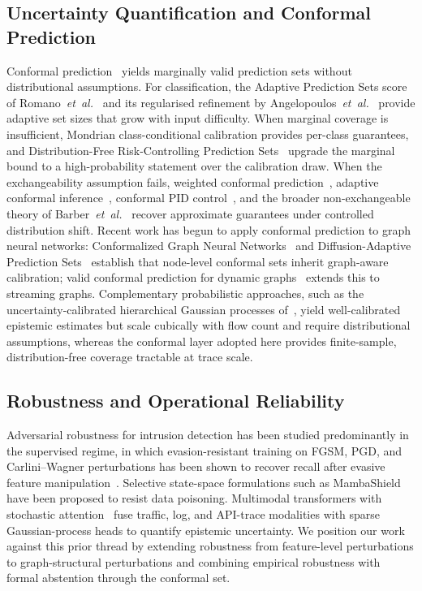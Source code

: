 \documentclass{ieeeaccess}
\begin{document}
\subsection{Uncertainty Quantification and Conformal Prediction}
Conformal prediction~\cite{vovk2022alrw,shafer2008tutorial,angelopoulos2023gentle}
yields marginally valid prediction sets without distributional assumptions.
For classification, the Adaptive Prediction Sets score of
Romano~\emph{et~al.}~\cite{romano2020aps} and its regularised refinement by
Angelopoulos~\emph{et~al.}~\cite{angelopoulos2021raps} provide adaptive set
sizes that grow with input difficulty. When marginal coverage is insufficient,
Mondrian class-conditional calibration provides per-class guarantees, and
Distribution-Free Risk-Controlling Prediction
Sets~\cite{bates2021rcps,angelopoulos2025ltt,angelopoulos2024crc} upgrade
the marginal bound to a high-probability statement over the calibration
draw. When the exchangeability assumption fails, weighted
conformal prediction~\cite{tibshirani2019wcp}, adaptive conformal
inference~\cite{gibbs2021aci}, conformal PID
control~\cite{angelopoulos2024pid}, and the broader non-exchangeable theory
of Barber~\emph{et~al.}~\cite{barber2023nonexch} recover approximate
guarantees under controlled distribution shift. Recent work has begun to
apply conformal prediction to graph neural networks: Conformalized Graph
Neural Networks~\cite{huang2023cfgnn} and Diffusion-Adaptive Prediction
Sets~\cite{zargarbashi2023daps} establish that node-level conformal sets
inherit graph-aware calibration; valid conformal prediction for dynamic
graphs~\cite{davis2025dyncp} extends this to streaming graphs.
Complementary probabilistic approaches, such as the uncertainty-calibrated
hierarchical Gaussian processes of~\cite{anaedevha2026hgp}, yield
well-calibrated epistemic estimates but scale cubically with flow count
and require distributional assumptions, whereas the conformal layer
adopted here provides finite-sample, distribution-free coverage tractable
at trace scale.

\subsection{Robustness and Operational Reliability}
Adversarial robustness for intrusion detection has been studied
predominantly in the supervised regime, in which evasion-resistant training
on FGSM, PGD, and Carlini--Wagner perturbations has been shown to recover
recall after evasive feature
manipulation~\cite{anaedevha2024robustadv}. Selective state-space
formulations such as MambaShield~\cite{anaedevha2025mambashield} have been
proposed to resist data poisoning. Multimodal transformers with stochastic
attention~\cite{anaedevha2025stochmm} fuse traffic, log, and API-trace
modalities with sparse Gaussian-process heads to quantify epistemic
uncertainty. We position our work against this prior thread by extending
robustness from feature-level perturbations to graph-structural
perturbations and combining empirical robustness with formal abstention
through the conformal set.
\end{document}
